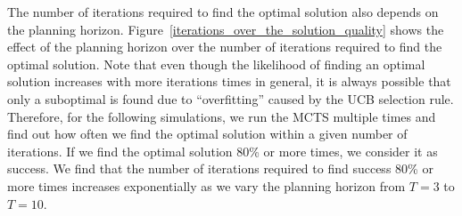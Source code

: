 \documentclass[10 pt, conference]{ieeeconf}
\newcommand{\PT}[1]{{\footnotesize\color{blue}[{\bf PT:} \textsf{#1}]}} %
\begin{document}
\begin{figure}[H]
\end{figure}
The number of iterations required to find the optimal solution also depends on the planning horizon. Figure~\ref{iterations_over_the_solution_quality} shows the effect of the planning horizon over the number of iterations required to find the optimal solution. Note that even though the likelihood of finding an optimal solution increases with more iterations times in general, it is always possible that only a suboptimal is found due to ``overfitting'' caused by the UCB selection rule. Therefore, for the following simulations, we run the MCTS multiple times and find out how often we find the optimal solution within a given number of iterations. If we find the optimal solution 80\% or more times, we consider it as success. We find that the number of iterations required to find success 80\% or more times increases exponentially as we vary the planning horizon from $T=3$ to $T=10$.




\end{document}
